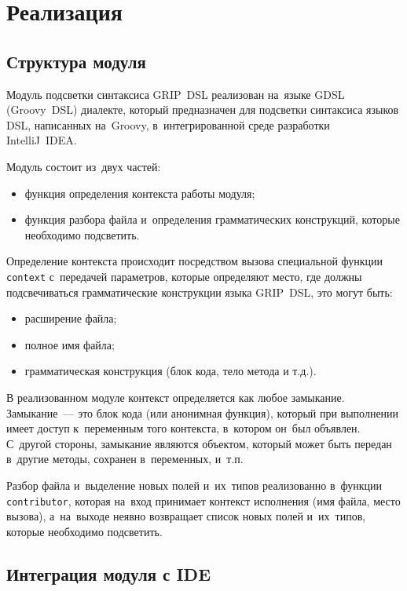 \section{Реализация} \label{sub24}

\subsection{Структура модуля} \label{sub241}

Модуль подсветки синтаксиса GRIP~DSL реализован на~языке GDSL (Groovy~DSL) диалекте, который предназначен для подсветки синтаксиса языков DSL, написанных на~Groovy, в~интегрированной среде разработки IntelliJ~IDEA.

Модуль состоит из~двух частей:

\begin{itemize}
	\item{функция определения контекста работы модуля;}
	\item{функция разбора файла и~определения грамматических конструкций, которые необходимо подсветить.}
\end{itemize} 

Определение контекста происходит посредством вызова специальной функции \texttt{context} с~передачей параметров, которые определяют место, где должны подсвечиваться грамматические конструкции языка GRIP~DSL, это могут быть:
\begin{itemize}
	\item{расширение файла;}
	\item{полное имя файла;}
	\item{грамматическая конструкция (блок кода, тело метода и т.д.).}
\end{itemize} 

В реализованном модуле контекст определяется как любое замыкание. Замыкание~--- это блок кода (или анонимная функция), который при выполнении имеет доступ к~переменным того контекста, в~котором он~был объявлен. С~другой стороны, замыкание являются объектом, который может быть передан в~другие методы, сохранен в~переменных, и~т.п.

Разбор файла и~выделение новых полей и~их~типов реализованно в~функции \texttt{contributor}, которая на~вход принимает контекст исполнения (имя файла, место вызова), а~на~выходе неявно возвращает список новых полей и~их~типов, которые необходимо подсветить.

\newpage

\subsection{Интеграция модуля с IDE} \label{sub242}

